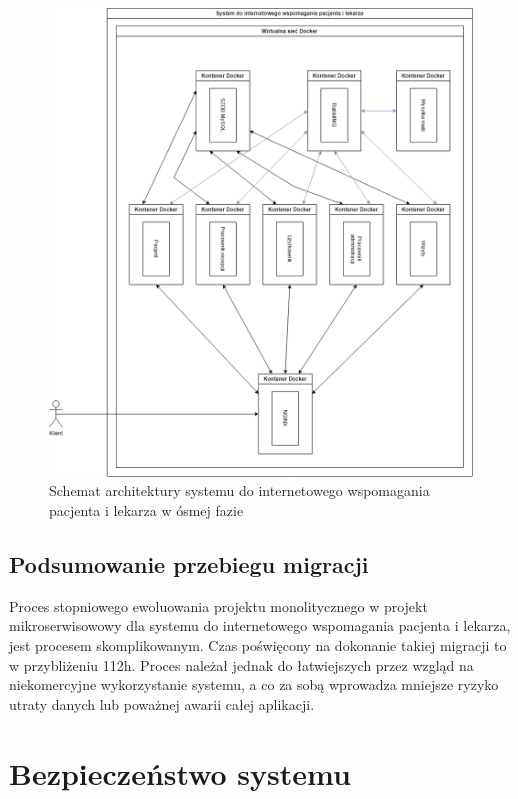 \documentclass[12pt,twoside]{book}
\newcommand{\captionvspace}{\vspace{6pt}}
\begin{document}
\begin{figure}[ht]
\centering
\includegraphics[width=\textwidth]{includes/images/migration-phase-8.png}
\captionvspace
\caption{Schemat architektury systemu do internetowego wspomagania pacjenta i lekarza w ósmej fazie}
\label{fig:migration-phase-8}
\end{figure}

\section{Podsumowanie przebiegu migracji}
Proces stopniowego ewoluowania projektu monolitycznego w projekt mikroserwisowowy dla systemu do internetowego wspomagania pacjenta i lekarza, jest procesem skomplikowanym. Czas poświęcony na dokonanie takiej migracji to w przybliżeniu 112h. Proces należał jednak do łatwiejszych przez wzgląd na niekomercyjne wykorzystanie systemu, a co za sobą wprowadza mniejsze ryzyko utraty danych lub poważnej awarii całej aplikacji.

\chapter{Bezpieczeństwo systemu}
\end{document}
